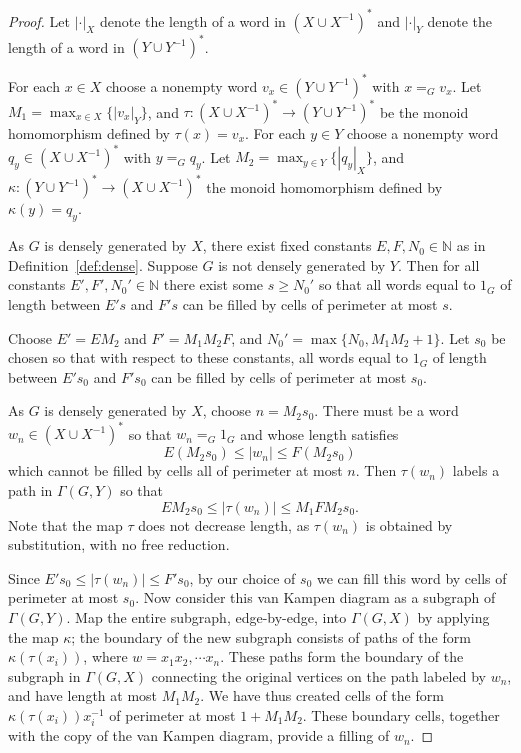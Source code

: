 \documentclass[11pt]{amsart}
\theoremstyle{definition}
\newcommand\N{\mathbb N}
\renewcommand{\geq}{\geqslant} \renewcommand{\leq}{\leqslant} \renewcommand{\ge}{\geqslant} \renewcommand{\le}{\leqslant}
\begin{document}
\begin{proof}
Let $| \cdot |_X$ denote the length of a word in $(X \cup X^{-1})^*$ and $| \cdot |_Y$ denote the length of a word in $(Y \cup Y^{-1})^*$.

For each $x\in X$ choose a nonempty word $v_x\in (Y\cup Y^{-1})^*$ with $x=_Gv_x$. Let $M_1=\max_{x\in X}\{|v_x|_Y\}$, and $\tau: (X\cup X^{-1 })^*\to (Y\cup Y^{-1})^*$ be  the monoid homomorphism defined by $\tau(x)=v_x$.
For each $y\in Y$ choose a nonempty word $q_y\in (X\cup X^{-1})^*$ with $y=_Gq_y$. Let $M_2=\max_{y\in Y}\{|q_y|_X\}$, and $\kappa: (Y\cup Y^{-1 })^*\to (X\cup X^{-1})^*$ the monoid homomorphism defined by $\kappa(y)=q_y$.

As $G$ is densely generated by  $X$, there exist fixed constants $E,F,N_0 \in \N$ as in Definition~\ref{def:dense}.
Suppose $G$ is not densely generated by $Y$. Then for all constants $E',F', N_0' \in \N$ there exist some $s\geq N_0'$
so that all words equal to $1_G$ of length between $E's$ and $F's$ can be filled by cells of perimeter at most $s$.

Choose $E'=EM_2$ and $F'=M_1M_2F$, and $N_0'=\max\{N_0,M_1M_2+1\}$.
Let $s_0$ be chosen so that with respect to these constants, all words equal to $1_G$ of length between $E's_0$ and $F's_0$ can be filled by cells of perimeter at most $s_0$.

As $G$ is densely generated by $X$, choose $n=M_2s_0$. There must be a word $w_n\in (X\cup X^{-1})^*$ so that $w_n =_G 1_G$ and whose length satisfies
\[E(M_2s_0)\leq |w_n|\leq F(M_2s_0)\]
which cannot be filled by cells all of perimeter at most $n$.
Then $\tau(w_n)$ labels a path in $\Gamma(G,Y)$ so that
\[EM_2s_0\leq |\tau(w_n)|\leq M_1FM_2s_0.\]
Note that the map $\tau$ does not decrease length, as $\tau(w_n)$ is obtained by substitution, with no free reduction.

Since $E's_0\leq |\tau(w_n)|\leq F's_0$, by our choice of $s_0$ we can fill this word
by cells of perimeter at most $s_0$. Now consider this van Kampen diagram as a subgraph of $\Gamma(G,Y)$.
Map the entire subgraph, edge-by-edge, into $\Gamma(G,X)$ by applying the map $\kappa$; the boundary of the new subgraph consists of paths of the form $\kappa(\tau(x_i))$, where $w = x_1x_2, \cdots x_n$.
These paths form the boundary of the subgraph in $\Gamma(G,X)$ connecting the original vertices on the path labeled by $w_n$, and have length at most $M_1M_2$.  We have thus created cells of the form $\kappa(\tau(x_i))x_i^{-1}$ of perimeter at most $1+M_1M_2$.
These boundary cells, together with the copy of the van Kampen diagram, provide a filling of $w_n$.


\end{proof}
\end{document}
